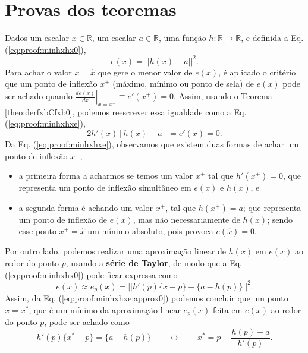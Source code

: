 \section{Provas dos teoremas}
 
\begin{myproofT}\label{proof:theo:minhxhx}
Dados
um escalar $x \in \mathbb{R}$, 
um escalar $a \in \mathbb{R}$,  
uma função $h:\mathbb{R} \rightarrow \mathbb{R}$, e 
definida a Eq. (\ref{eq:proof:minhxhx0}),
\begin{equation}\label{eq:proof:minhxhx0}
e(x)=||h(x)-a||^2.
\end{equation}
Para achar o valor  $x=\hat{x}$ que gere o menor valor de $e(x)$, é aplicado
o critério que um ponto de inflexão $x^+$ (máximo, mínimo ou ponto de sela) de $e(x)$ 
pode ser achado quando 
$\left. \frac{d e(x)}{d x }\right|_{x=x^+} \equiv e'(x^+) =0$.
Assim, 
usando o Teorema \ref{theo:derfxbCfxb0}, podemos 
reescrever essa igualdade como a Eq. (\ref{eq:proof:minhxhxe}),
\begin{equation}\label{eq:proof:minhxhxe}
2  h'(x) \left[h(x) -a\right] = e'(x)=0.
\end{equation}
Da Eq. (\ref{eq:proof:minhxhxe}), observamos 
que existem duas formas de achar um ponto de inflexão $x^+$,
\begin{itemize}
 \item a primeira forma a acharmos se temos um valor $x^+$ tal que $h'(x^+)=0$, 
que representa um ponto de inflexão simultâneo em $e(x)$ e $h(x)$, e
 \item a segunda forma é achando um valor $x^+$, tal que $h(x^+)=a$;
que representa um ponto de inflexão de $e(x)$, mas não
necessariamente de $h(x)$; 
sendo esse ponto $x^+=\hat{x}$ um mínimo absoluto, pois provoca $e(\hat{x})=0$.
\end{itemize}




Por outro lado, podemos realizar uma aproximação linear de $h(x)$ em $e(x)$
ao redor do ponto $p$, usando a \hyperref[def:taylor]{\textbf{série de Taylor}},
de modo que a Eq. (\ref{eq:proof:minhxhx0}) pode ficar expressa como
\begin{equation}\label{eq:proof:minhxhxe:approx0}
e(x) \approx  e_p(x) = ||h'(p)\{x-p\}-\{a-h(p)\}||^2.
\end{equation}
Assim, da Eq. (\ref{eq:proof:minhxhxe:approx0})
podemos concluir que um ponto $x=x^*$, que é 
um mínimo da aproximação linear $e_p(x)$ feita em $e(x)$ ao redor do ponto $p$,
pode ser achado como
\begin{equation}\label{eq:proof:minhxhx2}
 h'(p)\{x^*-p\} = \{a-h(p)\} \qquad \leftrightarrow \qquad x^* = p - \frac{h(p)-a}{ h'(p)}.
\end{equation} 


\end{myproofT}
